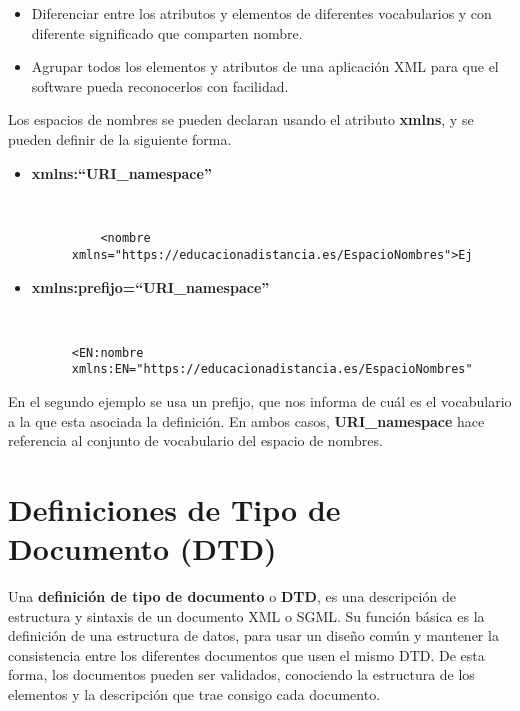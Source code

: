 \begin{itemize}
    \item Diferenciar entre los atributos y elementos de diferentes vocabularios y con diferente significado que comparten nombre.
    \item Agrupar todos los elementos y atributos de una aplicación XML para que el software pueda reconocerlos con facilidad.
\end{itemize}


Los espacios de nombres se pueden declaran usando el atributo \textbf{xmlns}, y se pueden definir de la siguiente forma.

\begin{itemize}
    \item \textbf{xmlns:``URI\_namespace''}

    \begin{figure}[h]
        \begin{tcolorbox}[sharp corners, colback=yellow!30, colframe=white!20]
            \scriptsize
            \begin{verbatim}


    <nombre xmlns="https://educacionadistancia.es/EspacioNombres">Ejemplo</nombre>
            \end{verbatim}
        \end{tcolorbox}

    \end{figure}

    \item \textbf{xmlns:prefijo=``URI\_namespace''}
    \begin{figure}[h]
        \begin{tcolorbox}[sharp corners, colback=yellow!30, colframe=white!20]
            \scriptsize
            \begin{verbatim}


<EN:nombre xmlns:EN="https://educacionadistancia.es/EspacioNombres">Ejemplo</EN:nombre>
            \end{verbatim}
        \end{tcolorbox}
    \end{figure}
\end{itemize}

En el segundo ejemplo se usa un prefijo, que nos informa de cuál es el vocabulario a la que esta asociada la definición. En ambos casos, \textbf{URI\_namespace} hace referencia al conjunto de vocabulario del espacio de nombres.

\section{Definiciones de Tipo de Documento (DTD)}
Una \textbf{definición de tipo de documento} o \textbf{DTD}, es una descripción de estructura y sintaxis de un documento XML o SGML. Su función básica es la definición de una estructura de datos, para usar un diseño común y mantener la consistencia entre los diferentes documentos que usen el mismo DTD. De esta forma, los documentos pueden ser validados, conociendo la estructura de los elementos y la descripción que trae consigo cada documento.

